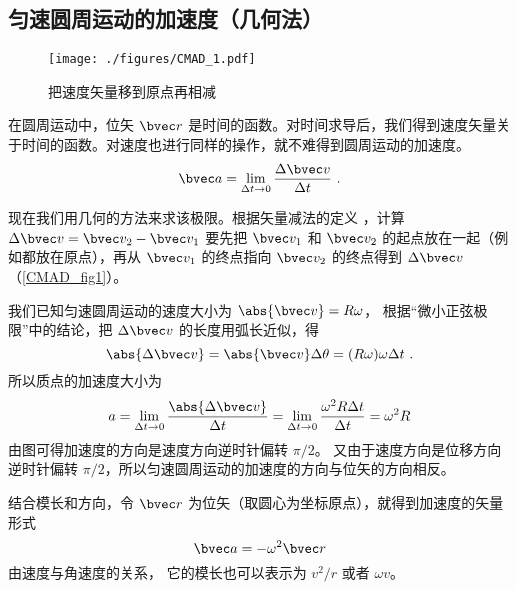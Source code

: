 

\subsection{匀速圆周运动的加速度（几何法）}

\begin{figure}[ht]
\centering
\texttt{[image: ./figures/CMAD\_1.pdf]}
\caption{把速度矢量移到原点再相减}\label{CMAD_fig1}
\end{figure}

在圆周运动中，位矢 $\bvec r$ 是时间的函数。对时间求导后，我们得到速度矢量关于时间的函数。对速度也进行同样的操作，就不难得到圆周运动的加速度。
\begin{equation}
\bvec a = \lim_{\Delta t \to 0} \frac{\Delta \bvec v}{\Delta t}~.
\end{equation}

现在我们用几何的方法来求该极限。根据矢量减法的定义%
，计算 $\Delta \bvec v = \bvec v_2 - \bvec v_1$ 要先把 $\bvec v_1$ 和 $\bvec v_2$ 的起点放在一起（例如都放在原点），再从 $\bvec v_1$ 的终点指向 $\bvec v_2$ 的终点得到 $\Delta \bvec v$ （\autoref{CMAD_fig1}）。 

我们已知匀速圆周运动的速度大小为 $\abs{\bvec v} = R\omega$， 根据“微小正弦极限”中的结论，把 $\Delta\bvec v$ 的长度用弧长近似，得
\begin{equation}
\abs{\Delta \bvec v} = \abs{\bvec v}\Delta \theta  = (R\omega)\omega \Delta t~.
\end{equation}
所以质点的加速度大小为
\begin{equation}
a =\lim_{\Delta t \to 0} \frac{\abs{\Delta \bvec v}}{\Delta t} =  \lim_{\Delta t \to 0} \frac{\omega ^2 R \Delta t}{\Delta t} = \omega ^2 R
\end{equation}
由图可得加速度的方向是速度方向逆时针偏转 $\pi/2$。 又由于速度方向是位移方向逆时针偏转 $\pi/2$，所以匀速圆周运动的加速度的方向与位矢的方向相反。

结合模长和方向，令 $\bvec r$ 为位矢（取圆心为坐标原点），就得到加速度的矢量形式
\begin{equation}\label{CMAD_eq4}
\bvec a =  - \omega ^2 \bvec r
\end{equation}
由速度与角速度的关系， %
它的模长也可以表示为 $v^2/r$ 或者 $\omega v$。

